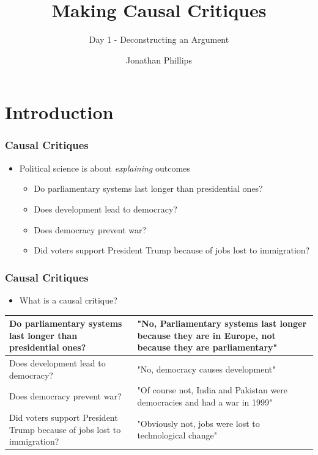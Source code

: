 \documentclass[xcolor=x11names,compress]{beamer}\usepackage[]{graphicx}\usepackage[]{color}
\title{Making Causal Critiques}
\subtitle{Day 1 - Deconstructing an Argument}
\author{Jonathan Phillips}
\renewcommand{\(}{\begin{columns}}
\renewcommand{\)}{\end{columns}}
\newcommand{\<}[1]{\begin{column}{#1}}
\renewcommand{\>}{\end{column}}
\begin{document}
\frame{\titlepage}

\section{Introduction}

\begin{frame}
\frametitle{Causal Critiques}
\begin{itemize}
\item Political science is about \textit{explaining} outcomes
\begin{itemize}
\item Do parliamentary systems last longer than presidential ones?
\item Does development lead to democracy?
\item Does democracy prevent war?
\item Did voters support President Trump because of jobs lost to immigration?
\end{itemize}
\end{itemize}

\end{frame}

\begin{frame}
\frametitle{Causal Critiques}
\begin{itemize}
\item What is a causal critique?
\end{itemize}
\begin{table}[htbp]
  \centering
    \begin{tabular}{|>{\raggedright}p{5cm}|p{5cm}|}
    \hline
    Do parliamentary systems last longer than presidential ones? & "No, Parliamentary systems last longer because they are in Europe, not because they are parliamentary" \pause \\
    \hline
    Does development lead to democracy? & "No, democracy causes development" \pause \\
    \hline
    Does democracy prevent war? & "Of course not, India and Pakistan were democracies and had a war in 1999" \pause \\
    \hline
    Did voters support President Trump because of jobs lost to immigration? & "Obviously not, jobs were lost to technological change" \\
    \hline
    \end{tabular}%
  \label{tab:addlabel}%
\end{table}%
\end{frame}
\end{document}
